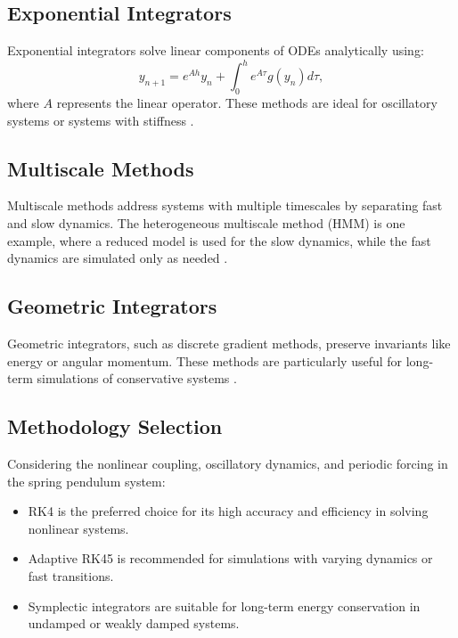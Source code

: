 \documentclass[12pt]{article}
\begin{document}
\subsection{Exponential Integrators}
Exponential integrators solve linear components of ODEs analytically using:
\[
y_{n+1} = e^{Ah}y_n + \int_0^h e^{A\tau}g(y_n)d\tau,
\]
where \( A \) represents the linear operator. These methods are ideal for oscillatory systems or systems with stiffness \cite{ascher1998computer}.

\subsection{ Multiscale Methods}
Multiscale methods address systems with multiple timescales by separating fast and slow dynamics. The heterogeneous multiscale method (HMM) is one example, where a reduced model is used for the slow dynamics, while the fast dynamics are simulated only as needed \cite{hairer1993solving}.

\subsection{Geometric Integrators}
Geometric integrators, such as discrete gradient methods, preserve invariants like energy or angular momentum. These methods are particularly useful for long-term simulations of conservative systems \cite{landau2015survey}.

\subsection{Methodology Selection}
Considering the nonlinear coupling, oscillatory dynamics, and periodic forcing in the spring pendulum system:
\begin{itemize}
    \item RK4 is the preferred choice for its high accuracy and efficiency in solving nonlinear systems.
    \item Adaptive RK45 is recommended for simulations with varying dynamics or fast transitions.
    \item Symplectic integrators are suitable for long-term energy conservation in undamped or weakly damped systems.
\end{itemize}
\end{document}
